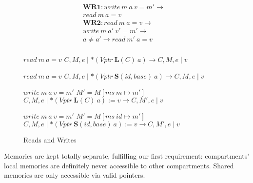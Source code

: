 \documentclass{article}
\begin{document}
\begin{figure}

  \begin{minipage}[t]{0.3\textwidth}
    \[\begin{aligned}
    \mathbf{WR1} : \mathit{write} ~ m ~ a ~ v = m' \rightarrow & \\
    \mathit{read} ~ m ~ a = v & \\[0.75em]
    \mathbf{WR2} : \mathit{read} ~ m ~ a = v \rightarrow & \\
    \mathit{write} ~ m ~ a' ~ v' = m' \rightarrow & \\
    a \not = a' \rightarrow \mathit{read} ~ m' ~ a = v & \\[0.75em]
    \end{aligned}\]
  \end{minipage}
  \begin{minipage}[t]{0.69\textwidth}
                {\(\mathit{read} ~ m ~ a = v\)}
                {\(C,M,e \mid *(\mathit{Vptr} ~ \mathbf{L}(C) ~ a)
                  \longrightarrow C,M,e \mid v\)}

                {\(\mathit{read} ~ m ~ a = v\)}
                {\(C,M,e \mid *(\mathit{Vptr} ~ \mathbf{S}(id, \mathit{base}) ~ a)
                  \longrightarrow C,M,e \mid v\)}

                  {\(\mathit{write} ~ m ~ a ~ v = m'\)}
                  {\(M' = M[ms ~ m \mapsto m']\)}
                  {\(C,M,e \mid *(\mathit{Vptr} ~ \mathbf{L}(C) ~ a) := v
                    \longrightarrow C,M',e \mid v\)}

                  {\(\mathit{write} ~ m ~ a ~ v = m'\)}
                  {\(M' = M[ms ~ id \mapsto m']\)}
                  {\(C,M,e \mid *(\mathit{Vptr} ~ \mathbf{S}(id, \mathit{base}) ~ a) := v
                    \longrightarrow C,M',e \mid v\)}
  \end{minipage}

  \caption{Reads and Writes}
  \label{subfig:rwstep}
\end{figure}


Memories are kept totally separate, fulfilling our first requirement:
compartments' local memories are definitely never accessible to other compartments.
Shared memories are only accessible via valid pointers.
\end{document}
